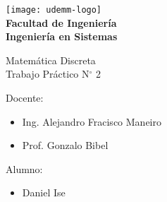 \begin{titlepage}
	\begin{center}
		\vspace*{0.5cm}
		\texttt{[image: udemm-logo]}\\
		\vspace{0.2cm}
		\Large
		\textbf{Facultad de Ingeniería}\\
		\textbf{Ingeniería en Sistemas}\\
		\vspace{2cm}

		\Huge
		Matemática Discreta\\
		Trabajo Práctico N$^{\circ}$ 2
		\vfill

		\raggedright
		\Large
		Docente:
		\begin{itemize}
			\item[] Ing. Alejandro Fracisco Maneiro\\
			\item[] Prof. Gonzalo Bibel\\
		\end{itemize}
		Alumno:
		\begin{itemize}
			\item[] Daniel Ise
		\end{itemize}
		\vspace{1cm}

	\end{center}
\end{titlepage}
